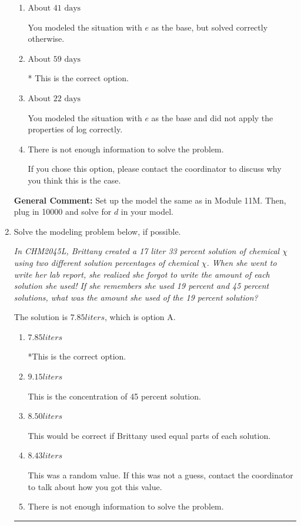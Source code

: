 \documentclass{extbook}[14pt]
\newcommand{\litem}[1]{\item #1

\rule{\textwidth}{0.4pt}}
\begin{document}
\begin{enumerate}
{\begin{enumerate}[label=\Alph*.]
You modeled the situation correctly but did not apply the properties of log correctly.
\item \( \text{About } 41 \text{ days} \)

You modeled the situation with $e$ as the base, but solved correctly otherwise.
\item \( \text{About } 59 \text{ days} \)

* This is the correct option.
\item \( \text{About } 22 \text{ days} \)

You modeled the situation with $e$ as the base and did not apply the properties of log correctly.
\item \( \text{There is not enough information to solve the problem.} \)

If you chose this option, please contact the coordinator to discuss why you think this is the case.
\end{enumerate}

\textbf{General Comment:} Set up the model the same as in Module 11M. Then, plug in 10000 and solve for $d$ in your model.
}
\litem{
Solve the modeling problem below, if possible.

\begin{center}
    \textit{ In CHM2045L, Brittany created a 17 liter 33 percent solution of chemical $\chi$ using two different solution percentages of chemical $\chi$. When she went to write her lab report, she realized she forgot to write the amount of each solution she used! If she remembers she used 19 percent and 45 percent solutions, what was the amount she used of the 19 percent solution? }
\end{center}
The solution is \( 7.85 liters \), which is option A.\begin{enumerate}[label=\Alph*.]
\item \( 7.85 liters \)

*This is the correct option.
\item \( 9.15 liters \)

This is the concentration of 45 percent solution.
\item \( 8.50 liters \)

This would be correct if Brittany used equal parts of each solution.
\item \( 8.43 liters \)

This was a random value. If this was not a guess, contact the coordinator to talk about how you got this value.
\item \( \text{There is not enough information to solve the problem.} \)


\end{enumerate}}
\end{enumerate}
\end{document}

